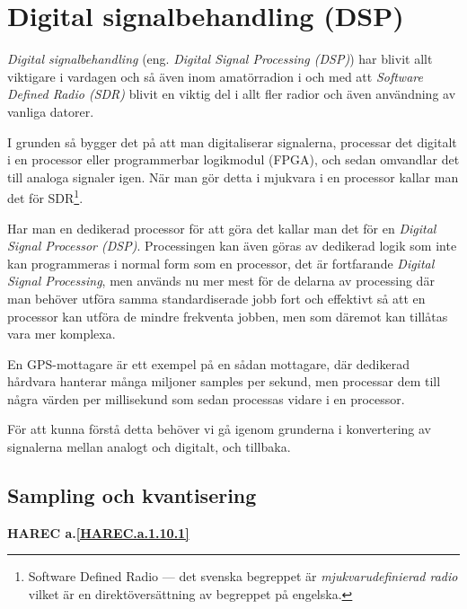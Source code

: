 \section{Digital signalbehandling (DSP)}
\label{DSP}

\emph{Digital signalbehandling} (eng. \emph{Digital Signal Processing (DSP)})
har blivit allt viktigare i vardagen och så även inom amatörradion i och med
att \emph{Software Defined Radio (SDR)} blivit en viktig del i allt fler
radior och även användning av vanliga datorer.

I grunden så bygger det på att man digitaliserar signalerna, processar det
digitalt i en processor eller programmerbar logikmodul (FPGA), och sedan
omvandlar det till analoga signaler igen.
När man gör detta i mjukvara i en processor kallar man det för SDR\footnote{Software Defined Radio --- det svenska begreppet är \emph{mjukvarudefinierad radio} vilket är en direktöversättning av begreppet på engelska.}.

Har man en dedikerad processor för att göra det kallar man det för en
\emph{Digital Signal Processor (DSP)}.
Processingen kan även göras av dedikerad logik som inte kan programmeras i
normal form som en processor, det är fortfarande
\emph{Digital Signal Processing}, men används nu mer mest för de delarna av
processing där man behöver utföra samma standardiserade jobb fort och effektivt
så att en processor kan utföra de mindre frekventa jobben, men som däremot kan
tillåtas vara mer komplexa.

En GPS-mottagare är ett exempel på en sådan mottagare, där dedikerad hårdvara
hanterar många miljoner samples per sekund, men processar dem till några värden
per millisekund som sedan processas vidare i en processor.

För att kunna förstå detta behöver vi gå igenom grunderna i konvertering av
signalerna mellan analogt och digitalt, och tillbaka.

\subsection{Sampling och kvantisering}
\textbf{HAREC a.\ref{HAREC.a.1.10.1}\label{myHAREC.a.1.10.1}}

